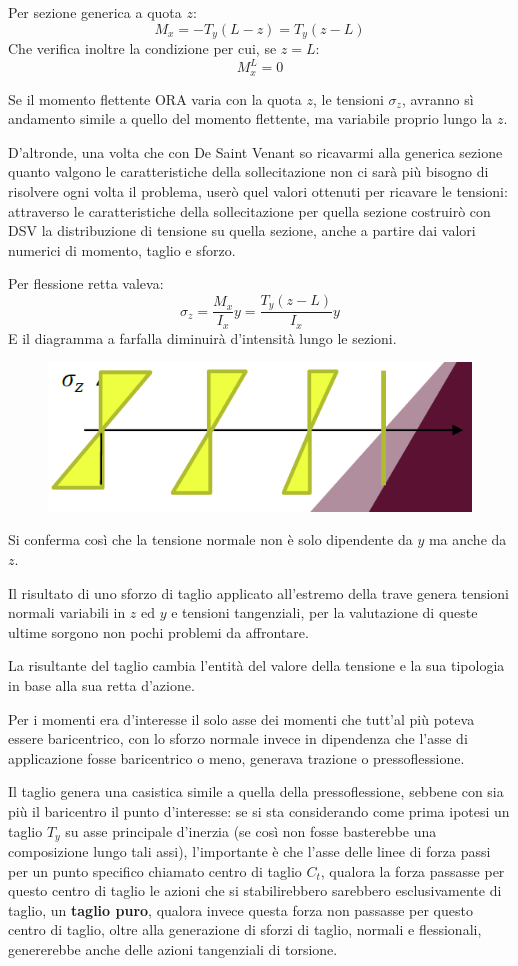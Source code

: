 		Per sezione generica a quota $z$: 
		\[M_x=-T_y(L-z) =T_y(z-L) \]
		Che verifica inoltre la condizione per cui, se $z=L$:
		\[M^L_x=0\]
		
		Se il momento flettente ORA varia con la quota $z$, le tensioni $\sigma_z$, avranno sì andamento simile a quello del momento flettente, ma variabile proprio lungo la $z$.
		
		D'altronde, una volta che con De Saint Venant so ricavarmi alla generica sezione quanto valgono le caratteristiche della sollecitazione non ci sarà più bisogno di risolvere ogni volta il problema, userò quel valori ottenuti per ricavare le tensioni: attraverso le caratteristiche della sollecitazione per quella sezione costruirò con DSV la distribuzione di tensione su quella sezione, anche a partire dai valori numerici di momento, taglio e sforzo.
		
		Per flessione retta valeva: 
		\[\sigma_z = \dfrac{M_x}{I_x}y = \dfrac{T_y(z-L)}{I_x}y\]
		E il diagramma a farfalla diminuirà d'intensità lungo le sezioni.

\begin{figure}[H]
	\centering
	\includegraphics[width=0.5\linewidth]{immagini_6/screenshot003}
	\label{fig:screenshot003}
\end{figure}

		Si conferma così che la tensione normale non è solo dipendente da $y$ ma anche da $z$.\newline 
		
		Il risultato di uno sforzo di taglio applicato all'estremo della trave genera tensioni normali variabili in $z$ ed $y$ e tensioni tangenziali, per la valutazione di queste ultime sorgono non pochi problemi da affrontare. \newline 
		
		La risultante del taglio cambia l'entità del valore della tensione e la sua tipologia in base alla sua retta d'azione.
		
		Per i momenti era d'interesse il solo asse dei momenti che tutt'al più poteva essere baricentrico, con lo sforzo normale invece in dipendenza che l'asse di applicazione fosse baricentrico o meno, generava trazione o pressoflessione. 
		
		Il taglio genera una casistica simile a quella della pressoflessione, sebbene con sia più il baricentro il punto d'interesse: se si sta considerando come prima ipotesi un taglio $T_y$ su asse principale d'inerzia (se così non fosse basterebbe una composizione lungo tali assi), l'importante è che l'asse delle linee di forza passi per un punto specifico chiamato centro di taglio $C_t$, qualora la forza passasse per questo centro di taglio le azioni che si stabilirebbero sarebbero esclusivamente di taglio, un \textbf{taglio puro}, qualora invece questa forza non passasse per questo centro di taglio, oltre alla generazione di sforzi di taglio, normali e flessionali, genererebbe anche delle azioni tangenziali di torsione. \newline 
		
